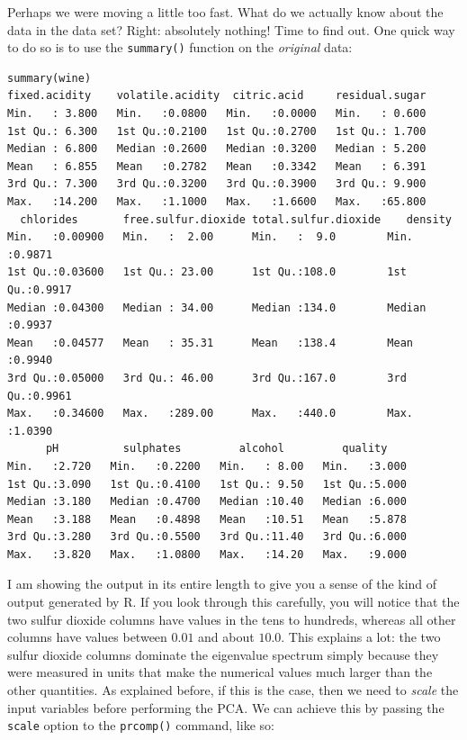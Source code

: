 Perhaps we were moving a little too fast. What do we actually know
about the data in the data set? Right: absolutely nothing! Time to
find out. One quick way to do so is to use the \texttt{summary()}
function on the \emph{original} data:\vspace*{9pt}

\begin{verbatim}
summary(wine)
fixed.acidity    volatile.acidity  citric.acid     residual.sugar  
Min.   : 3.800   Min.   :0.0800   Min.   :0.0000   Min.   : 0.600  
1st Qu.: 6.300   1st Qu.:0.2100   1st Qu.:0.2700   1st Qu.: 1.700  
Median : 6.800   Median :0.2600   Median :0.3200   Median : 5.200  
Mean   : 6.855   Mean   :0.2782   Mean   :0.3342   Mean   : 6.391  
3rd Qu.: 7.300   3rd Qu.:0.3200   3rd Qu.:0.3900   3rd Qu.: 9.900  
Max.   :14.200   Max.   :1.1000   Max.   :1.6600   Max.   :65.800  
  chlorides       free.sulfur.dioxide total.sulfur.dioxide    density     
Min.   :0.00900   Min.   :  2.00      Min.   :  9.0        Min.   :0.9871 
1st Qu.:0.03600   1st Qu.: 23.00      1st Qu.:108.0        1st Qu.:0.9917 
Median :0.04300   Median : 34.00      Median :134.0        Median :0.9937 
Mean   :0.04577   Mean   : 35.31      Mean   :138.4        Mean   :0.9940 
3rd Qu.:0.05000   3rd Qu.: 46.00      3rd Qu.:167.0        3rd Qu.:0.9961 
Max.   :0.34600   Max.   :289.00      Max.   :440.0        Max.   :1.0390 
      pH          sulphates         alcohol         quality     
Min.   :2.720   Min.   :0.2200   Min.   : 8.00   Min.   :3.000  
1st Qu.:3.090   1st Qu.:0.4100   1st Qu.: 9.50   1st Qu.:5.000  
Median :3.180   Median :0.4700   Median :10.40   Median :6.000  
Mean   :3.188   Mean   :0.4898   Mean   :10.51   Mean   :5.878  
3rd Qu.:3.280   3rd Qu.:0.5500   3rd Qu.:11.40   3rd Qu.:6.000  
Max.   :3.820   Max.   :1.0800   Max.   :14.20   Max.   :9.000  
\end{verbatim}

I am showing the output in its entire length to give you a sense of
the kind of output generated by R. If you look through this carefully,
you will notice that the two sulfur dioxide columns have values in the
tens to hundreds, whereas all other columns have values between $0.01$
and about $10.0$. This explains a lot: the two sulfur dioxide columns
dominate the eigenvalue spectrum simply because they were measured in
units that make the numerical values much larger than the other
quantities. As explained before, if this is the case, then we need to
\emph{scale} the input variables before performing the PCA. We can
achieve this by passing the \texttt{scale} option to the
\texttt{prcomp()} command,  like
so:\vspace*{9pt}

